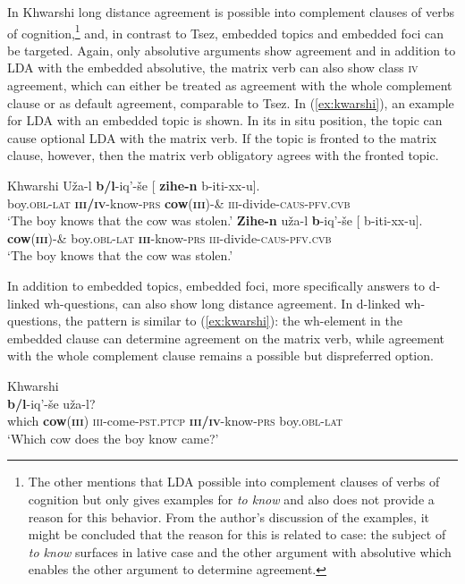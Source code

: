 \documentclass[output=paper
,modfonts
,nonflat]{langsci/langscibook}
\begin{document}
In Khwarshi \citep{Khalilova2008,Khalilova2009} long distance agreement is possible into complement clauses of verbs of cognition,\footnote{The other mentions that LDA possible into complement clauses of verbs of cognition but only gives examples for \textit{to know} and also does not provide a reason for this behavior. From the author's discussion of the examples, it might be concluded that the reason for this is related to case: the subject of \textit{to know} surfaces in lative case and the other argument with absolutive which enables the other argument to determine agreement.} and, in contrast to Tsez, embedded topics and embedded foci can be targeted. Again, only absolutive arguments show agreement and in addition to LDA with the embedded absolutive, the matrix verb can also show class \textsc{iv} agreement, which can either be treated as agreement with the whole complement clause or as default agreement, comparable to Tsez. In (\ref{ex:kwarshi}), an example for LDA with an embedded topic is shown. In its in situ position, the topic can cause optional LDA with the matrix verb. If the topic is fronted to the matrix clause, however, then the matrix verb obligatory agrees with the fronted topic.
\begin{exe}
\ex Khwarshi  \citep[][118]{Khalilova2008}\label{ex:kwarshi}
	\xlist
	\ex
		\gll U\v{z}a-l \textbf{b/l}-iq'-\v{s}e [ \textbf{zihe-n} b-iti-xx-u].\\
			 boy.\textsc{obl-lat}  \textbf{\textsc{iii/iv}}-know-\textsc{prs} {} \textbf{cow}(\textbf{\textsc{iii}})-\& \textsc{iii}-divide-\textsc{caus}-\textsc{pfv.cvb}\\
		\glt `The boy knows that the cow was stolen.'
	\ex
		\gll \textbf{Zihe-n} u\v{z}a-l \textbf{b}-iq'-\v{s}e [ b-iti-xx-u].\\
			 \textbf{cow}(\textbf{\textsc{iii}})-\& boy.\textsc{obl-lat} \textbf{\textsc{iii}}-know-\textsc{prs} {} \textsc{iii}-divide-\textsc{caus}-\textsc{pfv.cvb}\\
		\glt `The boy knows that the cow was stolen.'
	\endxlist
\end{exe}
In addition to embedded topics, embedded foci, more specifically answers to d-linked wh-questions, can also show long distance agreement. In d-linked wh-questions, the pattern is similar to (\ref{ex:kwarshi}): the wh-element in the embedded clause can determine agreement on the matrix verb, while agreement with the whole complement clause remains a possible but dispreferred option. 
\begin{exe}
\ex Khwarshi  \citep[][390]{Khalilova2008}\\
	 \textbf{b/l}-iq'-\v{s}e u\v{z}a-l?\\
		 {} which \textbf{cow}(\textbf{\textsc{iii}}) \textsc{iii}-come-\textsc{pst.ptcp} {} \textbf{\textsc{iii/iv}}-know-\textsc{prs} boy.\textsc{obl-lat}\\
	\glt `Which cow does the boy know came?'
\end{exe}
\end{document}
